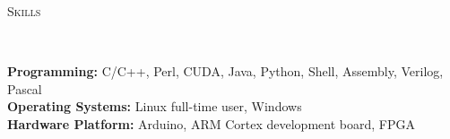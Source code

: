 \documentclass[a4paper, 12pt]{article}
\newenvironment{changemargin}[2]{%
  \begin{list}{}{%
      \setlength{\topsep}{0pt}%
      \setlength{\leftmargin}{#1}%
      \setlength{\rightmargin}{#2}%
      \setlength{\listparindent}{\parindent}%
      \setlength{\itemindent}{\parindent}%
      \setlength{\parsep}{\parskip}%
    }%
  \item[]}{\end{list}
}
\newcommand{\lineover}{
  \begin{changemargin}{-0.05in}{-0.05in}
    \vspace*{-8pt}
    \hrulefill \\
    \vspace*{-2pt}
  \end{changemargin}
}
\newcommand{\header}[1]{
  \begin{changemargin}{-0.6in}{-0.6in}
    \fontsize{15}{15}\scshape{#1}\\
    \lineover
    \vspace*{-4pt}
  \end{changemargin}
}
\newenvironment{body}
{
\vspace*{-16pt}
\begin{changemargin}{-0.25in}{-0.5in}
}
{
\end{changemargin}
}
\begin{document}
\smallskip
\header{Skills}
\begin{body}
  \vspace{14pt}
  \textbf{Programming:}{} C/C++, Perl, CUDA, Java, Python, Shell, Assembly, Verilog, Pascal\\
  \medskip
  \textbf{Operating Systems:}{} Linux full-time user, Windows\\
  \medskip
  \textbf{Hardware Platform:}{} Arduino, ARM Cortex development board, FPGA\\
\end{body}
\end{document}
